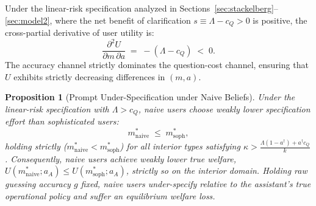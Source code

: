 \documentclass[11pt]{article}
\newtheorem{proposition}{Proposition}
\begin{document}
Under the linear-risk specification analyzed in Sections~\ref{sec:stackelberg}--\ref{sec:model2}, where the net benefit of clarification $s \equiv \Lambda - c_Q > 0$ is positive, the cross-partial derivative of user utility is:
\[
\frac{\partial^2 U}{\partial m\,\partial a} \;=\; -(\Lambda - c_Q) \;<\; 0.
\]
The accuracy channel strictly dominates the question-cost channel, ensuring that $U$ exhibits strictly decreasing differences in $(m,a)$.

\begin{proposition}[Prompt Under-Specification under Naive Beliefs]\label{prop:bias}
Under the linear-risk specification with $\Lambda > c_Q$, naive users choose weakly lower specification effort than sophisticated users:
\[
m^*_{\text{naive}} \;\le\; m^*_{\text{soph}},
\]
holding strictly ($m^*_{\text{naive}} < m^*_{\text{soph}}$) for all interior types satisfying $\kappa > \frac{\Lambda(1-a^\dagger) + a^\dagger c_Q}{k}$. Consequently, naive users achieve weakly lower true welfare, $U(m^*_{\text{naive}};a_A) \le U(m^*_{\text{soph}};a_A)$, strictly so on the interior domain. Holding raw guessing accuracy $g$ fixed, naive users under-specify relative to the assistant's true operational policy and suffer an equilibrium welfare loss.
\end{proposition}
\end{document}

